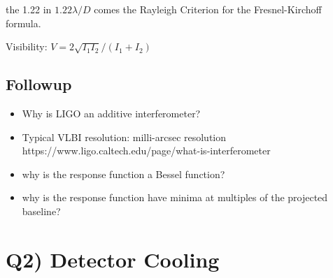 \documentclass[\main/main.tex]{subfiles}
\begin{document}
        the 1.22 in $1.22 \lambda / D$ comes the Rayleigh Criterion for the Fresnel-Kirchoff formula.
        
        Visibility: $V = 2\sqrt{I_1 I_2} / (I_1 + I_2)$
    
    \subsection{Followup}
    \begin{itemize}
        \item Why is LIGO an additive interferometer?
        \item Typical VLBI resolution: milli-arcsec resolution
            https://www.ligo.caltech.edu/page/what-is-interferometer
        \item why is the response function a Bessel function?
        \item why is the response function have minima at multiples of the projected baseline?
    \end{itemize}{}
        

	



\section{Q2) Detector Cooling} %
\label{sec:q2_detector_cooling}
\end{document}

